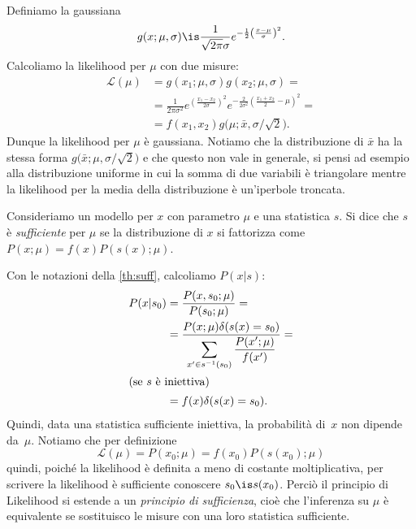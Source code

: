 
Definiamo la gaussiana
\begin{equation*}
	g(x;\mu,\sigma) \is \frac1{\sqrt{2\pi}\sigma} e^{-\frac12 \left( \frac{x-\mu}\sigma \right)^2}.
\end{equation*}
Calcoliamo la likelihood per $\mu$ con due misure:
\begin{align*}
	\mathcal L(\mu)
	&= g(x_1;\mu,\sigma) g(x_2;\mu,\sigma) = \\
	&= \frac1{2\pi\sigma^2}
	e^{\left( \frac{x_1-x_2}{2\sigma} \right)^2}
	e^{-\frac2{2\sigma^2} \left( \frac{x_1+x_2}2 - \mu \right)^2} = \\
	&= f(x_1,x_2) g \big( \mu;\bar x,\sigma/\sqrt2 \big).
\end{align*}
Dunque la likelihood per $\mu$ è gaussiana.
Notiamo che la distribuzione di $\bar x$ ha la stessa forma $g \big( \bar x;\mu,\sigma/\sqrt2 \big)$
e che questo non vale in generale, si pensi ad esempio alla distribuzione uniforme
in cui la somma di due variabili è triangolare mentre la likelihood per la media della distribuzione è un'iperbole troncata.

\begin{definition}[Sufficienza]
	\label{th:suff}
	Consideriamo un modello per $x$ con parametro $\mu$ e una statistica $s$.
	Si dice che $s$ è \emph{sufficiente} per $\mu$ se la distribuzione di $x$ si fattorizza come
	$P(x;\mu) = f(x) P(s(x);\mu)$.
\end{definition}

Con le notazioni della \autoref{th:suff}, calcoliamo $P(x|s)$:
\begin{align*}
	P(x|s_0)
	&= \frac{P(x,s_0;\mu)}{P(s_0;\mu)} = \\
	&= \frac{P(x;\mu) \delta(s(x)=s_0)}{\displaystyle \sum_{x'\in s^{-1}(s_0)} \frac{P(x';\mu)}{f(x')}} = \\
	\intertext{(se $s$ è iniettiva)}
	&= f(x) \delta(s(x)=s_0).
\end{align*}
Quindi, data una statistica sufficiente iniettiva, la probabilità di~$x$ non dipende da~$\mu$.
Notiamo che per definizione
\begin{equation*}
	\mathcal L(\mu) = P(x_0;\mu) = f(x_0) P(s(x_0);\mu)
\end{equation*}
quindi, poiché la likelihood è definita a meno di costante moltiplicativa,
per scrivere la likelihood è sufficiente conoscere $s_0 \is s(x_0)$.
Perciò il principio di Likelihood si estende a un \emph{principio di sufficienza},
cioè che l'inferenza su $\mu$ è equivalente se sostituisco le misure con una loro statistica sufficiente.

